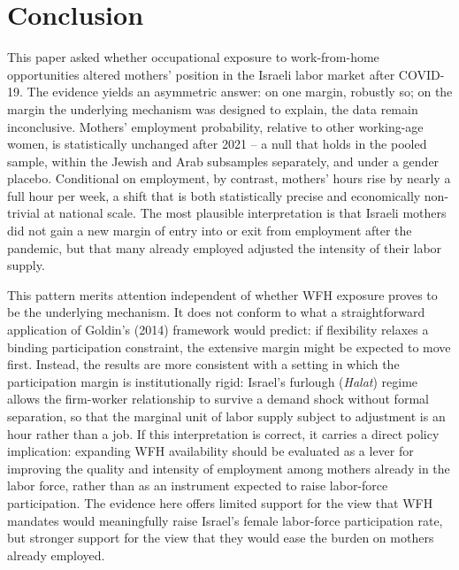 \documentclass[11pt]{article}
\begin{document}
\section{Conclusion}


This paper asked whether occupational exposure to work-from-home opportunities altered mothers' position in the Israeli labor market after COVID-19. The evidence yields an asymmetric answer: on one margin, robustly so; on the margin the underlying mechanism was designed to explain, the data remain inconclusive. Mothers' employment probability, relative to other working-age women, is statistically unchanged after 2021 -- a null that holds in the pooled sample, within the Jewish and Arab subsamples separately, and under a gender placebo. Conditional on employment, by contrast, mothers' hours rise by nearly a full hour per week, a shift that is both statistically precise and economically non-trivial at national scale. The most plausible interpretation is that Israeli mothers did not gain a new margin of entry into or exit from employment after the pandemic, but that many already employed adjusted the intensity of their labor supply.

This pattern merits attention independent of whether WFH exposure proves to be the underlying mechanism. It does not conform to what a straightforward application of Goldin's (2014) framework would predict: if flexibility relaxes a binding participation constraint, the extensive margin might be expected to move first. Instead, the results are more consistent with a setting in which the participation margin is institutionally rigid: Israel's furlough (\textit{Halat}) regime allows the firm-worker relationship to survive a demand shock without formal separation, so that the marginal unit of labor supply subject to adjustment is an hour rather than a job. If this interpretation is correct, it carries a direct policy implication: expanding WFH availability should be evaluated as a lever for improving the quality and intensity of employment among mothers already in the labor force, rather than as an instrument expected to raise labor-force participation. The evidence here offers limited support for the view that WFH mandates would meaningfully raise Israel's female labor-force participation rate, but stronger support for the view that they would ease the burden on mothers already employed.
\end{document}
